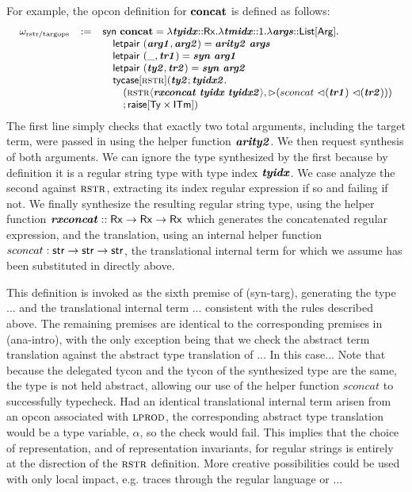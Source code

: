\documentclass{llncs}
\begin{document}
For example, the opcon definition for $\textbf{concat}$ is defined as follows:
\[\small
\begin{array}{lcl}
\omega_\text{rstr/targops} & := & \keyw{syn}~\opname{concat}=\slam{\krx}{\svar{tyidx}}{
    \slam{\kunit}{\svar{tmidx}}{
        \slam{\kargs}{\svar{args}}{\\&&
            \quad \keyw{letpair}~(\svar{arg1}, \svar{arg2}) = \svar{arity2}~\svar{args}\\&&
            \quad \keyw{letpair}~(\_, \svar{tr1}) = \svar{syn}~\svar{arg1}\\&&
            \quad \keyw{letpair}~(\svar{ty2}, \svar{tr2}) = \svar{syn}~\svar{arg2}\\&&
            \quad \stycase{\tcvar{rstr}}{\svar{ty2}}{\svar{tyidx2}}{\\&&
                \quad\quad (\sty{\tcvar{rstr}}{\svar{rxconcat}~\svar{tyidx}~\svar{tyidx2}}, \sqitm{sconcat~\quq{\svar{tr1}}~\quq{\svar{tr2}}})\\&&\quad\quad
            }{\sraise{\kty\times\kitm}}
        }
    }
}
\end{array}
\]
The first line simply checks that exactly two total arguments, including the target term, were passed in using the helper function ${\textbf{\textit{arity2}}}$. We then request synthesis of both arguments. We can ignore the type synthesized by the first because by definition it is a regular string type with type index ${\textbf{\textit{tyidx}}}$. We case analyze the second against $\textsc{rstr}$, extracting its index regular expression if so and failing if not. We finally synthesize the resulting regular string type, using the helper function ${\textbf{\textit{rxconcat}}} :: {\sf Rx} \rightarrow {\sf Rx} \rightarrow {\sf Rx}$ which generates the concatenated regular expression, and the translation, using an internal helper function $sconcat : {\sf str} \rightarrow {\sf str} \rightarrow {\sf str}$, the translational internal term for which we assume has been substituted in directly above.

This definition is invoked as the sixth premise of (syn-targ), generating the type ...  and the translational internal term ... consistent with the rules described above. The remaining premises are identical to the corresponding premises in (ana-intro), with the only exception being that we check the abstract term translation against the abstract type translation of ... In this case... Note that because the delegated tycon and the tycon of the synthesized type are the same, the type is not held abstract, allowing our use of the helper function $sconcat$ to successfully typecheck. Had an identical translational internal term arisen from an opcon associated with $\textsc{lprod}$, the corresponding abstract type translation would be a type variable, $\alpha$, so the check would fail. This implies that the choice of representation, and of representation invariants, for regular strings is entirely at the disrection of the $\textsc{rstr}$ definition. More creative possibilities could be used with only local impact, e.g. traces through the regular language or ...
\end{document}

